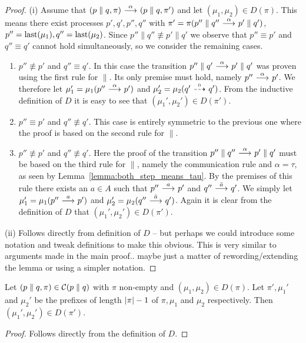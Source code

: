 \begin{proof}
    (i) Assume that $(p\parallel q, \pi) \ {\stackrel{{\alpha}}{\longrightarrow}}\  (p\parallel q, \pi')$ and let
    $(\mu_1,\mu_2)\in D(\pi)$. This means there exist processes $p',q',p'',q''$
    with $\pi' = \pi(p''\parallel q'' \ {\stackrel{{\alpha}}{\longrightarrow}}\  p'\parallel q')$,
    $p''=\operatorname{last}(\mu_1), q''=\operatorname{last}(\mu_2)$.
    Since $p''\parallel q'' \not\equiv
    p'\parallel q'$ we observe that $p''\equiv p'$ and $q''\equiv q'$ cannot hold
    simultaneously, so we consider the remaining cases.
    \begin{enumerate}
        \item $p''\not\equiv p'$ and $q''\equiv q'$. In this case the transition
            $p''\parallel q' \ {\stackrel{{\alpha}}{\longrightarrow}}\  p'\parallel q'$ was proven using the first
            rule for $\parallel$. Its only premise must hold, namely $p''\ {\stackrel{{\alpha}}{\longrightarrow}}\  p'$.
            We therefore let $\mu_1' = \mu_1(p''\ {\stackrel{{\alpha}}{\longrightarrow}}\ p')$ and $\mu_2' = \mu_2
            (q' \ {\stackrel{_{0}}{\dashrightarrow}}\  q')$. From the inductive definition of $D$ it is easy to see
            that $(\mu_1',\mu_2') \in D(\pi')$.
        \item $p''\equiv p'$ and $q''\not\equiv q'$. This case is entirely symmetric
            to the previous one where the proof is based on the second rule for $\parallel$.
        \item $p''\not\equiv p'$ and $q''\not\equiv q'$. Here the proof
            of the transition $p''\parallel q'' \ {\stackrel{{\alpha}}{\longrightarrow}}\  p'\parallel q'$ must be based
            on the third rule for $\parallel$, 
            namely the communication rule and $\alpha=\tau$, as seen by
            Lemma~\ref{lemma:both_step_means_tau}. By the premises of this rule there
            exists an $a\in A$ such that $p''\ {\stackrel{{a}}{\longrightarrow}}\ p'$ and $q''\ {\stackrel{{\bar{a}}}{\longrightarrow}}\ q'$. We simply
            let $\mu_1' = \mu_1(p''\ {\stackrel{{a}}{\longrightarrow}}\ p')$ and $\mu_2' = \mu_2(q''\ {\stackrel{{\bar{a}}}{\longrightarrow}}\ q')$.
            Again it is clear from the definition of $D$ that $(\mu_1',\mu_2')\in D(\pi')$.
    \end{enumerate}

    (ii)  Follows directly from definition of $D$ -- but perhaps we could introduce
    some notation and tweak definitions to make this obvious. This is very similar to arguments
    made in the main proof.. maybe just a matter of rewording/extending the lemma or using
    a simpler notation.

\end{proof}

\begin{lemma}\label{lemma:removing_last_trans}
    Let $(p\parallel q,\pi) \in \mathcal{C}(p\parallel q)$ with $\pi$ non-empty and $(\mu_1,\mu_2)
    \in D(\pi)$. Let $\pi',\mu_1'$ and $\mu_2'$ be the prefixes of length $|\pi|-1$ of $\pi,
    \mu_1$ and $\mu_2$ respectively. Then $(\mu_1',\mu_2') \in D(\pi')$.
\end{lemma}
\begin{proof}
    Follows directly from the definition of $D$.
\end{proof}

